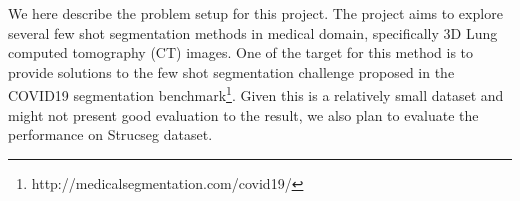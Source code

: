 We here describe the problem setup for this project. The project aims to explore several few shot segmentation methods in medical domain, specifically 3D Lung computed tomography (CT) images. One of the target for this method is to provide solutions to the few shot segmentation challenge proposed in the COVID19 segmentation benchmark\footnote{http://medicalsegmentation.com/covid19/}. Given this is a relatively small dataset and might not present good evaluation to the result, we also plan to evaluate the performance on Strucseg dataset.